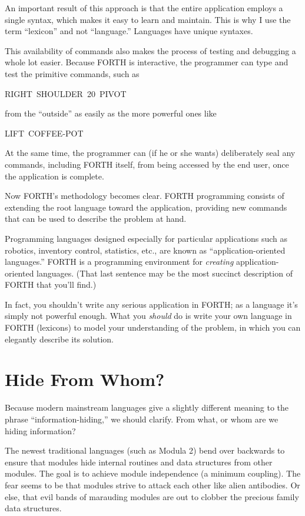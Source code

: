 An important result of this approach is that the entire application
employs a single syntax, which makes it easy to learn and maintain.
This is why I use the term {}``lexicon'' and not {}``language.''
Languages have unique syntaxes.

This availability of commands also makes the process of testing and
debugging a whole lot easier. Because FORTH is interactive, the programmer
can type and test the primitive commands, such as

\begin{lyxcode}
RIGHT~SHOULDER~20~PIVOT
\end{lyxcode}
from the {}``outside'' as easily as the more powerful ones like

\begin{lyxcode}
LIFT~COFFEE-POT
\end{lyxcode}
At the same time, the programmer can (if he or she wants) deliberately
seal any commands, including FORTH itself, from being accessed by
the end user, once the application is complete.

Now FORTH's methodology becomes clear. FORTH programming consists
of extending the root language toward the application, providing new
commands that can be used to describe the problem at hand.

Programming languages designed especially for particular applications
such as robotics, inventory control, statistics, etc., are known as
{}``application-oriented languages.'' FORTH is a programming environment
for \emph{creating} application-oriented languages. (That last sentence
may be the most succinct description of FORTH that you'll find.)

In fact, you shouldn't write any serious application in FORTH; as
a language it's simply not powerful enough. What you \emph{should}
do is write your own language in FORTH (lexicons) to model your understanding
of the problem, in which you can elegantly describe its solution.


\section*{Hide From Whom?}

Because modern mainstream languages give a slightly different meaning
to the phrase {}``information-hiding,'' we should clarify. From
what, or whom are we hiding information?

The newest traditional languages (such as Modula 2) bend over backwards
to ensure that modules hide internal routines and data structures
from other modules. The goal is to achieve module independence (a
minimum coupling). The fear seems to be that modules strive to attack
each other like alien antibodies. Or else, that evil bands of marauding
modules are out to clobber the precious family data structures.

